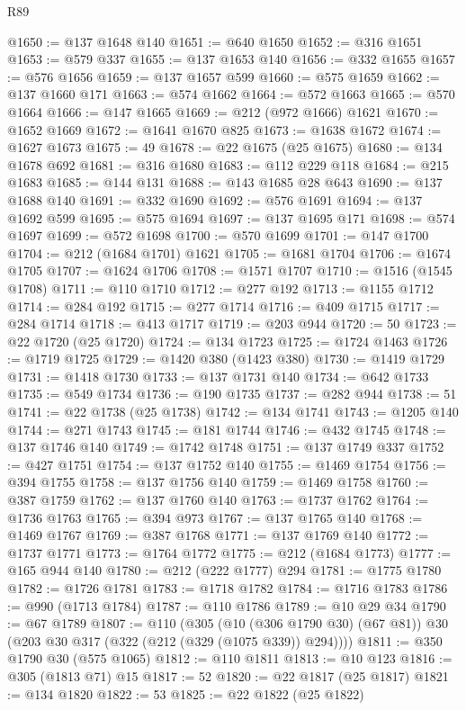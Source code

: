 \begin{lexlean}{R89}
\begin{coremodule}
@1650 := @137 @1648 @140
@1651 := @640 @1650
@1652 := @316 @1651
@1653 := @579 @337
@1655 := @137 @1653 @140
@1656 := @332 @1655
@1657 := @576 @1656
@1659 := @137 @1657 @599
@1660 := @575 @1659
@1662 := @137 @1660 @171
@1663 := @574 @1662
@1664 := @572 @1663
@1665 := @570 @1664
@1666 := @147 @1665
@1669 := @212 (@972 @1666) @1621
@1670 := @1652 @1669
@1672 := @1641 @1670 @825
@1673 := @1638 @1672
@1674 := @1627 @1673
@1675 := 49
@1678 := @22 @1675 (@25 @1675)
@1680 := @134 @1678 @692
@1681 := @316 @1680
@1683 := @112 @229 @118
@1684 := @215 @1683
@1685 := @144 @131
@1688 := @143 @1685 @28 @643
@1690 := @137 @1688 @140
@1691 := @332 @1690
@1692 := @576 @1691
@1694 := @137 @1692 @599
@1695 := @575 @1694
@1697 := @137 @1695 @171
@1698 := @574 @1697
@1699 := @572 @1698
@1700 := @570 @1699
@1701 := @147 @1700
@1704 := @212 (@1684 @1701) @1621
@1705 := @1681 @1704
@1706 := @1674 @1705
@1707 := @1624 @1706
@1708 := @1571 @1707
@1710 := @1516 (@1545 @1708)
@1711 := @110 @1710
@1712 := @277 @192
@1713 := @1155 @1712
@1714 := @284 @192
@1715 := @277 @1714
@1716 := @409 @1715
@1717 := @284 @1714
@1718 := @413 @1717
@1719 := @203 @944
@1720 := 50
@1723 := @22 @1720 (@25 @1720)
@1724 := @134 @1723
@1725 := @1724 @1463
@1726 := @1719 @1725
@1729 := @1420 @380 (@1423 @380)
@1730 := @1419 @1729
@1731 := @1418 @1730
@1733 := @137 @1731 @140
@1734 := @642 @1733
@1735 := @549 @1734
@1736 := @190 @1735
@1737 := @282 @944
@1738 := 51
@1741 := @22 @1738 (@25 @1738)
@1742 := @134 @1741
@1743 := @1205 @140
@1744 := @271 @1743
@1745 := @181 @1744
@1746 := @432 @1745
@1748 := @137 @1746 @140
@1749 := @1742 @1748
@1751 := @137 @1749 @337
@1752 := @427 @1751
@1754 := @137 @1752 @140
@1755 := @1469 @1754
@1756 := @394 @1755
@1758 := @137 @1756 @140
@1759 := @1469 @1758
@1760 := @387 @1759
@1762 := @137 @1760 @140
@1763 := @1737 @1762
@1764 := @1736 @1763
@1765 := @394 @973
@1767 := @137 @1765 @140
@1768 := @1469 @1767
@1769 := @387 @1768
@1771 := @137 @1769 @140
@1772 := @1737 @1771
@1773 := @1764 @1772
@1775 := @212 (@1684 @1773)
@1777 := @165 @944 @140
@1780 := @212 (@222 @1777) @294
@1781 := @1775 @1780
@1782 := @1726 @1781
@1783 := @1718 @1782
@1784 := @1716 @1783
@1786 := @990 (@1713 @1784)
@1787 := @110 @1786
@1789 := @10 @29 @34
@1790 := @67 @1789
@1807 := @110
    (@305
      (@10 (@306 @1790 @30) (@67 @81))
      @30
      (@203 @30 @317 (@322 (@212 (@329 (@1075 @339)) @294))))
@1811 := @350 @1790 @30 (@575 @1065)
@1812 := @110 @1811
@1813 := @10 @123
@1816 := @305 (@1813 @71) @15
@1817 := 52
@1820 := @22 @1817 (@25 @1817)
@1821 := @134 @1820
@1822 := 53
@1825 := @22 @1822 (@25 @1822)

\end{coremodule}
\end{lexlean}
